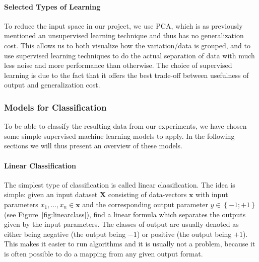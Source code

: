 \paragraph{Selected Types of Learning}
\label{par:SelectedTypesofLearning}
To reduce the input space in our project, we use PCA, which is as previously mentioned an unsupervised learning technique
and thus has no generalization cost. This allows us to both visualize how the variation/data is grouped, and to
use supervised learning techniques to do the actual separation of data with much less noise and more performance than otherwise.
The choice of supervised learning is due to the fact that it offers the best trade-off between usefulness of output and generalization cost.

\subsubsection{Models for Classification}
\label{ssub:ModelsforClassification}
To be able to classify the resulting data from our experiments, we have chosen some simple supervised machine learning models to apply.
In the following sections we will thus present an overview of these models.
\paragraph{Linear Classification}
\label{par:LinearClassification}
The simplest type of classification is called linear classification.
The idea is simple: given an input dataset $\mathbf{X}$ consisting of data-vectors $\mathbf{x}$ with input parameters $x_1, \dots, x_n \in \mathbf{x}$ and the corresponding output parameter $y \in \left\{-1;+1\right\}$ (see Figure~\ref{fig:linearclass}), 
find a linear formula which separates the outputs given by the input parameters.
The classes of output are usually denoted as either being negative (the output being $-1$) or positive (the output being $+1$). 
This makes it easier to run algorithms and it is usually not a problem, because it is often possible to do a mapping from any given output format.\\

\begin{minipage}{\linewidth}
\centering
{}
\label{fig:linearclass}
\end{minipage}\\\\

